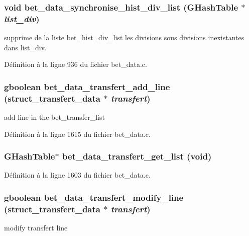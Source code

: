\subsubsection[{bet\_\-data\_\-synchronise\_\-hist\_\-div\_\-list}]{\setlength{\rightskip}{0pt plus 5cm}void bet\_\-data\_\-synchronise\_\-hist\_\-div\_\-list (GHashTable $\ast$ {\em list\_\-div})}\label{bet__data_8h_a91745c4a532e0241a7a257fb8aa53a93}
supprime de la liste bet\_\-hist\_\-div\_\-list les divisions sous divisions inexistantes dans list\_\-div. 

Définition à la ligne 936 du fichier bet\_\-data.c.

\subsubsection[{bet\_\-data\_\-transfert\_\-add\_\-line}]{\setlength{\rightskip}{0pt plus 5cm}gboolean bet\_\-data\_\-transfert\_\-add\_\-line ({\bf struct\_\-transfert\_\-data} $\ast$ {\em transfert})}\label{bet__data_8h_ae27191a1ef681788491163590697b53f}
add line in the bet\_\-transfer\_\-list 

Définition à la ligne 1615 du fichier bet\_\-data.c.

\subsubsection[{bet\_\-data\_\-transfert\_\-get\_\-list}]{\setlength{\rightskip}{0pt plus 5cm}GHashTable$\ast$ bet\_\-data\_\-transfert\_\-get\_\-list (void)}\label{bet__data_8h_a77e5c063714b4d86398084828d7b78eb}


Définition à la ligne 1603 du fichier bet\_\-data.c.

\subsubsection[{bet\_\-data\_\-transfert\_\-modify\_\-line}]{\setlength{\rightskip}{0pt plus 5cm}gboolean bet\_\-data\_\-transfert\_\-modify\_\-line ({\bf struct\_\-transfert\_\-data} $\ast$ {\em transfert})}\label{bet__data_8h_ae6b517cdcf60d19b28ab333c4ff74d7b}
modify transfert line 

